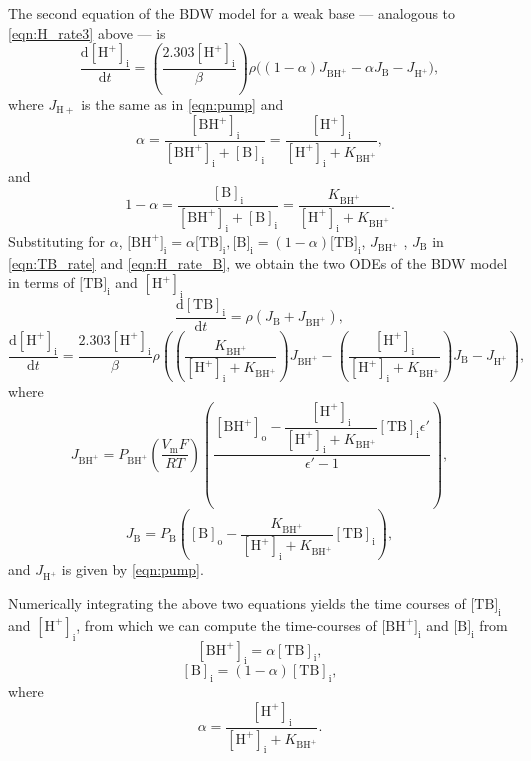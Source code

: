 \documentclass[fleqn,10pt]{physiome}
\begin{document}
The second equation of the BDW model for a weak base --- analogous to \autoref{eqn:H_rate3} above --- is
\begin{equation}
\dfrac{\mathrm{d[H^+]_i}}{\mathrm{d}t}=\left(\dfrac{2.303\mathrm{[H^+]_i}}{\beta}\right) \rho\bigg((1-\alpha)J_\mathrm{BH^+}-\alpha J_\mathrm{B}-J_\mathrm{H^+}\bigg),
\label{eqn:H_rate_B}
\end{equation}
where $J_\mathrm{H+}$ is the same as in \autoref{eqn:pump} and 
\begin{equation}
\alpha=\dfrac{\mathrm{[BH^+]_i}}{\mathrm{[BH^+]_i}+\mathrm{[B]_i}}=\dfrac{\mathrm{[H^+]_i}}{\mathrm{[H^+]_i}+K_\mathrm{BH^+}},
\label{eqn:alpha_B}
\end{equation}
and
\begin{equation}
1-\alpha=\dfrac{\mathrm{[B]_i}}{\mathrm{[BH^+]_i}+\mathrm{[B]_i}}=\dfrac{K_\mathrm{BH^+}}{\mathrm{[H^+]_i}+K_\mathrm{BH^+}}.
\label{eqn:alpha_B2}
\end{equation}
Substituting for $\alpha$, $[\mathrm{BH^+]_i} = \alpha [\mathrm{TB]_i}, [\mathrm{B]_i} = (1-\alpha) [\mathrm{TB]_i}$, $J_\mathrm{BH^+}$ , $J_\mathrm{B}$ in \autoref{eqn:TB_rate} and \autoref{eqn:H_rate_B}, we obtain the two ODEs of the BDW model in terms of $[\mathrm{TB]_i}$ and $\mathrm{[H^+]_i}$ 
\begin{equation}
\dfrac{\mathrm{d[TB]_i}}{\mathrm{d}t}=\rho\left(J_\mathrm{B}+J_\mathrm{BH^+} \right),
\label{eqn:TB}
\end{equation}
\begin{equation}
\dfrac{\mathrm{d[H^+]_i}}{\mathrm{d}t}=\dfrac{2.303\mathrm{[H^+]_i}}{\beta}\rho\left(\left(\dfrac{K_\mathrm{BH^+}}{\mathrm{[H^+]_i}+K_\mathrm{BH^+}}\right)J_\mathrm{BH^+}-\left(\dfrac{\mathrm{[H^+]_i}}{\mathrm{[H^+]_i}+K_\mathrm{BH^+}}\right)J_\mathrm{B}-J_\mathrm{H^+} \right),
\label{eqn:B_H}
\end{equation}
where
\begin{equation*}
J_\mathrm{BH^+}=P_\mathrm{BH^+}\left(\dfrac{V_\mathrm{m}F}{RT}\right)\left(\dfrac{\mathrm{[BH^+]_o}-\dfrac{\mathrm{[H^+]_i}}{\mathrm{[H^+]_i}+K_\mathrm{BH^+}}\mathrm{[TB]_i} \epsilon '}{\epsilon '-1}\right),
\end{equation*}
\begin{equation*}
J_\mathrm{B}=P_\mathrm{B}\left( \mathrm{[B]_o}-\dfrac{K_\mathrm{BH^+}}{\mathrm{[H^+]_i}+K_\mathrm{BH^+}}\mathrm{[TB]_i} \right),
\end{equation*}
and $J_\mathrm{H^+}$ is given by \autoref{eqn:pump}.

Numerically integrating the above two equations yields the time courses of $[\mathrm{TB]_i}$ and $\mathrm{[H^+]_i}$, from which we can compute the time-courses of $[\mathrm{BH^+]_i}$ and $[\mathrm{B]_i}$ from
\begin{equation}
\mathrm{[BH^+]_i}=\alpha\mathrm{[TB]_i},
\end{equation}
\begin{equation}
\mathrm{[B]_i}=(1-\alpha)\mathrm{[TB]_i},
\end{equation}
where
\begin{equation}
\alpha=\dfrac{\mathrm{[H^+]_i}}{\mathrm{[H^+]_i}+K_\mathrm{BH^+}}.
\end{equation}
\end{document}
